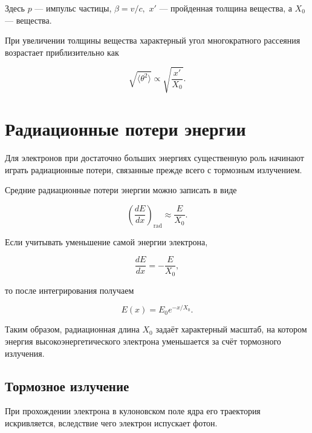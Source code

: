 \documentclass[../final.tex]{subfiles}
\begin{document}
Здесь $p$ --- импульс частицы,
\( \beta=v / c ,  \) 
$x'$ --- пройденная толщина вещества, а $X_0$ ---
 вещества.

При увеличении толщины вещества характерный угол многократного
рассеяния возрастает приблизительно как

\begin{equation*}
    \sqrt{\langle\theta^2\rangle}
    \propto
    \sqrt{\frac{x'}{X_0}}.
\end{equation*}


\section{Радиационные потери энергии}

Для электронов при достаточно больших энергиях существенную роль
начинают играть радиационные потери, связанные прежде всего
с тормозным излучением.

Средние радиационные потери энергии можно записать в виде

\begin{equation*}
    \left(
        \frac{dE}{dx}
    \right)_{\mathrm{rad}}
    \approx
    \frac{E}{X_0}.
\end{equation*}

Если учитывать уменьшение самой энергии электрона,

\begin{equation*}
    \frac{dE}{dx}
    =
    -\frac{E}{X_0},
\end{equation*}

то после интегрирования получаем

\begin{equation*}
    E(x)
    =
    E_0
    e^{-x/X_0}.
\end{equation*}

Таким образом, радиационная длина $X_0$ задаёт характерный масштаб,
на котором энергия высокоэнергетического электрона уменьшается
за счёт тормозного излучения.


\subsection{Тормозное излучение}

При прохождении электрона в кулоновском поле ядра его траектория
искривляется, вследствие чего электрон испускает фотон.
\end{document}
